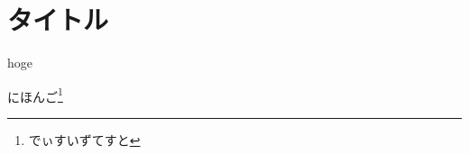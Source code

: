 \documentclass{word}
\subtitle{hoge}
\author{著者}
\begin{document}
\chapter{タイトル}
hoge

にほんご\footnote{でぃすいずてすと}
\end{document}
